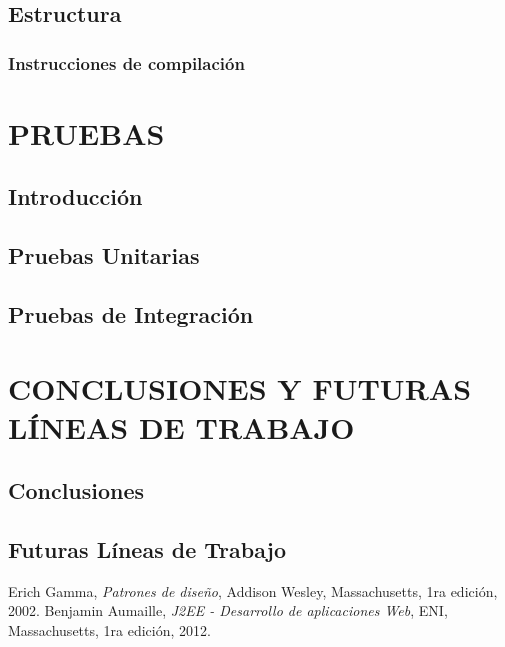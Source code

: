 \documentclass[12pt, a4paper, twoside]{book}
\begin{document}
	\section{Estructura}
	
	\subsection{Instrucciones de compilación}
	
	\chapter{PRUEBAS}
	\section{Introducción}
	
	\section{Pruebas Unitarias}

	\section{Pruebas de Integración}
	
	\chapter{CONCLUSIONES Y FUTURAS LÍNEAS DE TRABAJO}
	\section{Conclusiones}
	
	\section{Futuras Líneas de Trabajo}
	
	\renewcommand{\bibname}{Enlaces de interés}
	\begin{thebibliography}{99}
		Erich Gamma,
		\emph{Patrones de diseño},
		Addison Wesley, Massachusetts,
		1ra edición,
		2002.
		Benjamin Aumaille,
		\emph{J2EE - Desarrollo de aplicaciones Web},
		ENI, Massachusetts,
		1ra edición,
		2012.
	\end{thebibliography}
\end{document}

